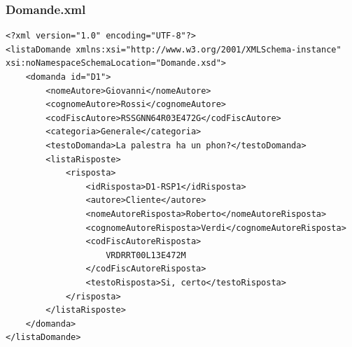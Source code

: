 \documentclass [a4paper, 12pt]{book}
\begin{document}
\subsubsection{Domande.xml}
\begin{lstlisting}[style=XML]
<?xml version="1.0" encoding="UTF-8"?>
<listaDomande xmlns:xsi="http://www.w3.org/2001/XMLSchema-instance" xsi:noNamespaceSchemaLocation="Domande.xsd">
    <domanda id="D1">
        <nomeAutore>Giovanni</nomeAutore>
        <cognomeAutore>Rossi</cognomeAutore>
        <codFiscAutore>RSSGNN64R03E472G</codFiscAutore>
        <categoria>Generale</categoria>
        <testoDomanda>La palestra ha un phon?</testoDomanda>
        <listaRisposte>
            <risposta>
            	<idRisposta>D1-RSP1</idRisposta>
                <autore>Cliente</autore>
                <nomeAutoreRisposta>Roberto</nomeAutoreRisposta>
                <cognomeAutoreRisposta>Verdi</cognomeAutoreRisposta>
                <codFiscAutoreRisposta>
                	VRDRRT00L13E472M
                </codFiscAutoreRisposta>
                <testoRisposta>Si, certo</testoRisposta>
            </risposta>
        </listaRisposte>
    </domanda>
</listaDomande>
\end{lstlisting}
\end{document}
